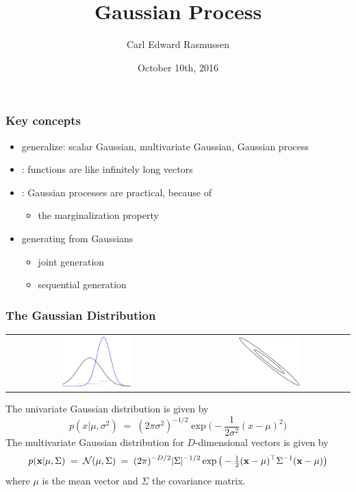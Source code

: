

\title{Gaussian Process}
\author{Carl Edward Rasmussen}
\date{October 10th, 2016}



\begin{frame}
\titlepage
\end{frame}

\begin{frame}
\frametitle{Key concepts}
\begin{itemize}
\item generalize: scalar Gaussian, multivariate Gaussian, Gaussian process
\item {}: functions are like infinitely long vectors
\item {}: Gaussian processes are practical, because of
\begin{itemize}
\item the marginalization property
\end{itemize}
\item generating from Gaussians
\begin{itemize}
\item joint generation
\item sequential generation
\end{itemize}
\end{itemize}
\end{frame}

\begin{frame}
\frametitle{The Gaussian Distribution}
\begin{center}
\begin{tabular}{cc}
\includegraphics[width=0.4\textwidth]{gauss00} &
{\includegraphics[width=0.4\textwidth]{gauss01}}
\end{tabular}
\end{center}
The univariate Gaussian distribution is given by
\[
p(x|\mu,\sigma^2) \;=\; (2 \pi \sigma^2 )^{-1/2} \exp \big( - \frac{1}{2
  \sigma^2} (x-\mu)^2 \big)
\]
The multivariate Gaussian distribution for $D$-dimensional vectors is given by
\[
p(\mathbf x|\mu,\Sigma)\;=\;{\cal N}(\mu,\Sigma)\;=\;(2\pi)^{-D/2}|\Sigma|^{-1/2}
\exp\big(-\tfrac{1}{2}(\mathbf x-\mu)^\top\Sigma^{-1}(\mathbf x-\mu)\big)
\]
where $\mu$ is the mean vector and $\Sigma$ the covariance matrix.
\end{frame}


